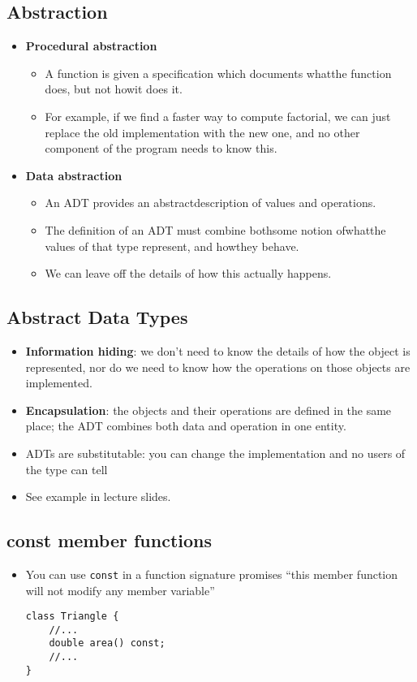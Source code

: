 \subsection{Abstraction}
\begin{itemize}
	\item \textbf{Procedural abstraction}
	\begin{itemize}
		\item A function is given a specification which documents whatthe function does, but not howit does it.
		\item For example, if we find a faster way to compute factorial, we can just replace the old implementation with the new one, and no other component of the program needs to know this.
	\end{itemize}
	\item \textbf{Data abstraction}
	\begin{itemize}
		\item An ADT provides an abstractdescription of values and operations.
		\item The definition of an ADT must combine bothsome notion ofwhatthe values of that type represent, and howthey behave.
		\item We can leave off the details of how this actually happens.
	\end{itemize}
\end{itemize}

\subsection{Abstract Data Types}
\begin{itemize}
	\item \textbf{Information hiding}: we don't need to know the details of how the object is represented, nor do we need to know how the operations on those objects are implemented.
	\item \textbf{Encapsulation}: the objects and their operations are defined in the same place; the ADT combines both data and operation in one entity.
	\item ADTs are substitutable: you can change the implementation and no users of the type can tell
	\item See example in lecture slides.
\end{itemize}

\subsection{const member functions}
\begin{itemize}
	\item You can use \lstinline[style=C++]{const} in a function signature promises ``this member function will not modify any member variable''
\begin{lstlisting}[style=C++]
class Triangle {
	//...
	double area() const;
	//...
}
\end{lstlisting}
\end{itemize}

